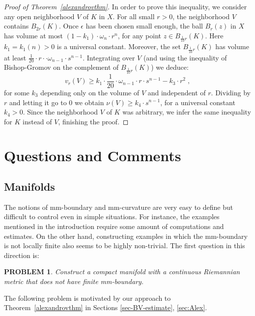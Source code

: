 \documentclass[12pt,leqno]{amsart}
\numberwithin{equation}{section}
\newtheorem{quest}[thm]{PROBLEM}
\theoremstyle{definition}
\theoremstyle{remark}
\newcommand{\tref}[1]{Theorem~\ref{#1}}
\begin{document}
\begin{proof}[Proof of Theorem~\ref{alexandrovthm}]
	In order to prove this inequality, we consider any open neighborhood $V$ of $K$ in $X$.   For all small $r>0$, the neighborhood $V$ contains $B_{2r} (K)$.  Once $\epsilon$ has been chosen small enough,   the ball   $B_r (z)$ in $X$ has  volume at most
   $ (1-k_1)  \cdot \omega _n \cdot  r^n$,  for
	any point $z\in  B_{\frac 1 {10} r} (K)$. Here  $ k_1=k_1(n)>0 $ is a universal constant.
	 Moreover,  the set  $B_{\frac 1 {10} r} (K)$  has volume at least $\frac 1 {20} \cdot r\cdot \cdot \omega _{n-1} \cdot   s^{n-1}$.
	Integrating over $V$  (and using the inequality of Bishop-Gromov on the complement of   $B_{\frac 1 {10} r} (K)$) we deduce:
	$$v_r (V) \geq k_1\cdot \frac 1 {20} \cdot \omega _{n-1}  \cdot r\cdot s^{n-1}  -  k_3 \cdot r^2 \;,$$
	for some $k_3$ depending only on the volume of $V$ and independent of $r$.
	Dividing by $r$ and letting it go to $0$ we obtain $\nu (V) \geq k_4\cdot s^{n-1}$, for a universal constant $k_4>0$.
 Since the neighborhood $V$ of $K$ was arbitrary,
	we infer the same inequality for $K$ instead of $V$, finishing the proof.
\end{proof}














\section{Questions and Comments} \label{sec:final}
\subsection{Manifolds}
The notions of mm-boundary and mm-curvature are very easy to define but   difficult to control even in  simple situations.
For instance, the examples mentioned in the introduction require some amount of computations and estimates.  On the other hand, constructing examples in which the mm-boundary is not locally finite  also seems to be highly non-trivial.  The first  question in this direction is:


\begin{quest}
 Construct a compact manifold with a continuous Riemannian metric
that does not have finite mm-boundary.
\end{quest}

 The following problem is motivated by our approach to \tref{alexandrovthm} in Sections \ref{sec-BV-estimate}, \ref{sec:Alex}.
\end{document}
